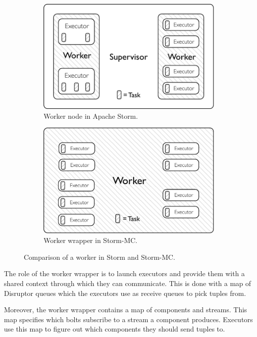 \begin{figure}[!htb]
\centering
\begin{subfigure}{.5\textwidth}
  \centering
  \includegraphics[width=0.95\linewidth]{pdf/distributed_worker.pdf}
  \caption{Worker node in Apache Storm.}
  \label{fig:comparison1}
\end{subfigure}%
\begin{subfigure}{.5\textwidth}
  \centering
  \includegraphics[width=0.95\linewidth]{pdf/local_worker.pdf}
  \caption{Worker wrapper in Storm-MC.}
  \label{fig:comparison2}
\end{subfigure}
\caption{Comparison of a worker in Storm and Storm-MC.}
\label{fig:comparison}
\end{figure}

The role of the worker wrapper is to launch executors and provide them with a shared context through which they can communicate. This is done with a map of Disruptor queues which the executors use as receive queues to pick tuples from.

Moreover, the worker wrapper contains a map of components and streams. This map specifies which bolts subscribe to a stream a component produces. Executors use this map to figure out which components they should send tuples to.

